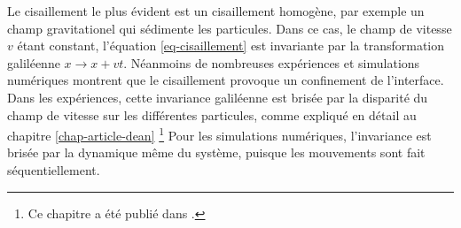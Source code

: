 Le cisaillement le plus évident est un cisaillement homogène, par exemple un champ gravitationel qui sédimente les particules. Dans ce cas, le champ de vitesse $v$ étant constant, l'équation \ref{eq-cisaillement} est invariante par la transformation galiléenne $x \rightarrow x+vt$. 
Néanmoins de nombreuses expériences\cite{derks_suppression_2006} et simulations numériques \cite{leung_field_1986,rikvold_microstructure_2002,gonnella_nonequilibrium_2009,smith_driven_2010,smith_interfaces_2008,sadhu_non-local_2014,cohen_interface_2016} montrent que le cisaillement provoque un confinement de l'interface. Dans les expériences, cette invariance galiléenne est brisée par la disparité du champ de vitesse sur les différentes particules, comme expliqué en détail au chapitre \ref{chap-article-dean} \footnote{Ce chapitre a été publié dans \cite{dean_effect_2020}.}
Pour les simulations numériques, l'invariance est brisée par la dynamique même du système, puisque les mouvements sont fait séquentiellement. 

